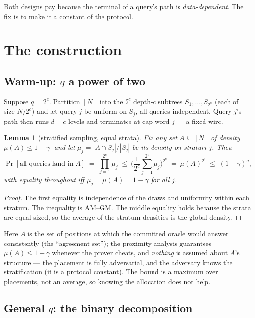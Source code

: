 \documentclass[11pt]{article}
\newtheorem{lemma}{Lemma}
\theoremstyle{definition}
\begin{document}
Both designs pay because the terminal of a query's path is
\emph{data-dependent}. The fix is to make it a constant of the protocol.

\section{The construction}

\subsection{Warm-up: $q$ a power of two}

Suppose $q = 2^c$. Partition $[N]$ into the $2^c$ depth-$c$ subtrees
$S_1, \dots, S_{2^c}$ (each of size $N/2^c$) and let query $j$ be
uniform on $S_j$, all queries independent. Query $j$'s path then runs
$d - c$ levels and terminates at cap word $j$ --- a fixed wire.

\begin{lemma}[stratified sampling, equal strata]\label{lem:amgm}
Fix any set $A \subseteq [N]$ of density $\mu(A) \le 1-\gamma$, and let
$\mu_j = |A \cap S_j| / |S_j|$ be its density on stratum $j$. Then
\[
\Pr[\text{all queries land in } A] \;=\; \prod_{j=1}^{2^c} \mu_j
\;\le\; \Big( \frac{1}{2^c} \sum_{j=1}^{2^c} \mu_j \Big)^{2^c}
\;=\; \mu(A)^{2^c} \;\le\; (1-\gamma)^{q},
\]
with equality throughout iff $\mu_j = \mu(A) = 1 - \gamma$ for all $j$.
\end{lemma}

\begin{proof}
The first equality is independence of the draws and uniformity within
each stratum. The inequality is AM--GM. The middle equality holds
because the strata are equal-sized, so the average of the stratum
densities is the global density.
\end{proof}

Here $A$ is the set of positions at which the committed oracle would
answer consistently (the ``agreement set''); the proximity analysis
guarantees $\mu(A) \le 1-\gamma$ whenever the prover cheats, and
\emph{nothing} is assumed about $A$'s structure --- the placement is
fully adversarial, and the adversary knows the stratification (it is a
protocol constant). The bound is a maximum over placements, not an
average, so knowing the allocation does not help.

\subsection{General $q$: the binary decomposition}
\end{document}
